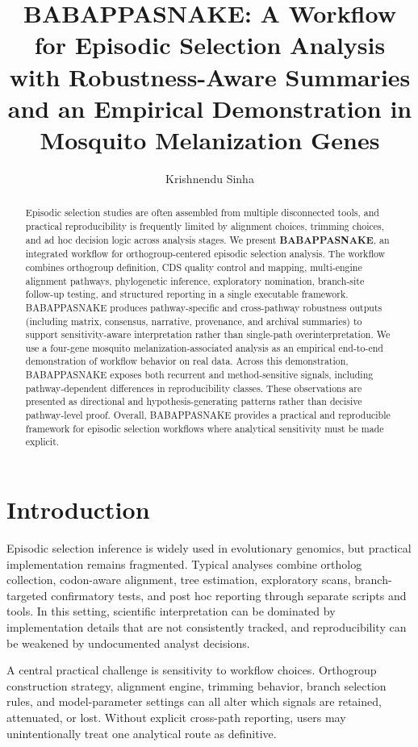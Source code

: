 \documentclass[11pt]{article}
\title{BABAPPASNAKE: A Workflow for Episodic Selection Analysis with Robustness-Aware Summaries and an Empirical Demonstration in Mosquito Melanization Genes}
\author{Krishnendu Sinha}
\date{}
\begin{document}
\maketitle

\begin{abstract}
Episodic selection studies are often assembled from multiple disconnected tools, and practical reproducibility is frequently limited by alignment choices, trimming choices, and ad hoc decision logic across analysis stages.
We present \textbf{BABAPPASNAKE}, an integrated workflow for orthogroup-centered episodic selection analysis.
The workflow combines orthogroup definition, CDS quality control and mapping, multi-engine alignment pathways, phylogenetic inference, exploratory nomination, branch-site follow-up testing, and structured reporting in a single executable framework.
BABAPPASNAKE produces pathway-specific and cross-pathway robustness outputs (including matrix, consensus, narrative, provenance, and archival summaries) to support sensitivity-aware interpretation rather than single-path overinterpretation.
We use a four-gene mosquito melanization-associated analysis as an empirical end-to-end demonstration of workflow behavior on real data.
Across this demonstration, BABAPPASNAKE exposes both recurrent and method-sensitive signals, including pathway-dependent differences in reproducibility classes.
These observations are presented as directional and hypothesis-generating patterns rather than decisive pathway-level proof.
Overall, BABAPPASNAKE provides a practical and reproducible framework for episodic selection workflows where analytical sensitivity must be made explicit.
\end{abstract}

\section{Introduction}
Episodic selection inference is widely used in evolutionary genomics, but practical implementation remains fragmented.
Typical analyses combine ortholog collection, codon-aware alignment, tree estimation, exploratory scans, branch-targeted confirmatory tests, and post hoc reporting through separate scripts and tools.
In this setting, scientific interpretation can be dominated by implementation details that are not consistently tracked, and reproducibility can be weakened by undocumented analyst decisions.

A central practical challenge is sensitivity to workflow choices.
Orthogroup construction strategy, alignment engine, trimming behavior, branch selection rules, and model-parameter settings can all alter which signals are retained, attenuated, or lost.
Without explicit cross-path reporting, users may unintentionally treat one analytical route as definitive.
\end{document}
